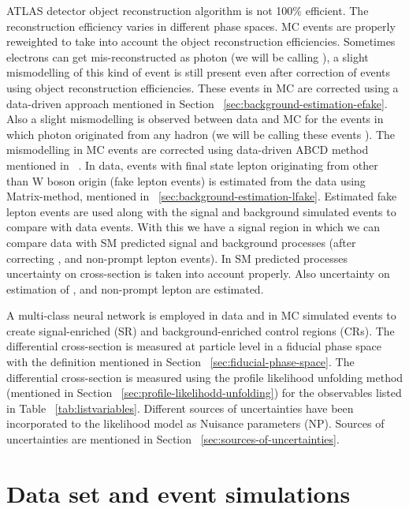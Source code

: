 ATLAS detector object reconstruction algorithm is not 100\% efficient. The reconstruction efficiency varies in different phase spaces. MC events are properly reweighted to take into account the object reconstruction efficiencies. Sometimes electrons can get mis-reconstructed as photon (we will be calling \efake), a slight mismodelling of this kind of event is still present even after correction of events using object reconstruction efficiencies. These \efake events in MC are corrected using a data-driven approach mentioned in Section ~\cref{sec:background-estimation-efake}. Also a slight mismodelling is observed between data and MC for the events in which photon originated from any hadron (we will be calling these events \hfake). The mismodelling in MC \hfake events are corrected using data-driven ABCD method mentioned in ~\cite{DiezPardos:2781712}. In data, events with final state lepton originating from other than W boson origin (fake lepton events) is estimated from the data using Matrix-method, mentioned in ~\cref{sec:background-estimation-lfake}. Estimated fake lepton events are used along with the signal and background simulated events to compare with data events. With this we have a signal region in which we can compare data with SM predicted signal and background processes (after correcting \efake, \hfake and non-prompt lepton events). In SM predicted processes uncertainty on cross-section is taken into account properly. Also uncertainty on estimation of \efake, \hfake and non-prompt lepton are estimated.

A multi-class neural network is employed in data and in MC simulated events to create signal-enriched (SR) and background-enriched control regions (CRs). The differential cross-section is measured at particle level in a fiducial phase space with the definition mentioned in Section ~\cref{sec:fiducial-phase-space}. The differential cross-section is measured using the profile likelihood unfolding method (mentioned in Section ~\cref{sec:profile-likelihodd-unfolding}) for the observables listed in Table ~\cref{tab:listvariables}.
Different sources of uncertainties have been incorporated to the likelihood model as Nuisance parameters (NP). Sources of uncertainties are mentioned in Section ~\cref{sec:sources-of-uncertainties}.



\section{Data set and event simulations}
\label{sec:data-and-mc-simulations}


